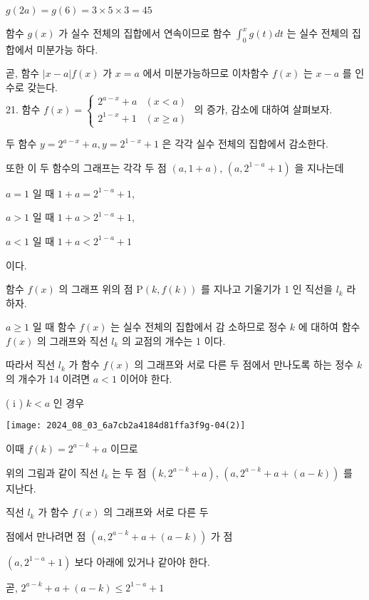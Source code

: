 \documentclass[10pt]{article}
\begin{document}
\(g(2 a)=g(6)=3 \times 5 \times 3=45\)

함수 \(g(x)\) 가 실수 전체의 집합에서 연속이므로 함수 \(\int_{0}^{x} g(t) d t\) 는 실수 전체의 집합에서 미분가능 하다.

곧, 함수 \(|x-a| f(x)\) 가 \(x=a\) 에서 미분가능하므로 이차함수 \(f(x)\) 는 \(x-a\) 를 인수로 갖는다.\\
21. 함수 \(f(x)=\left\{\begin{array}{ll}2^{a-x}+a & (x<a) \\ 2^{1-x}+1 & (x \geq a)\end{array}\right.\) 의 증가, 감소에 대하여 살펴보자.

두 함수 \(y=2^{a-x}+a, y=2^{1-x}+1\) 은 각각 실수 전체의 집합에서 감소한다.

또한 이 두 함수의 그래프는 각각 두 점 \((a, 1+a)\), \(\left(a, 2^{1-a}+1\right)\) 을 지나는데

\(a=1\) 일 때 \(1+a=2^{1-a}+1\),

\(a>1\) 일 때 \(1+a>2^{1-a}+1\),

\(a<1\) 일 때 \(1+a<2^{1-a}+1\)

이다.

함수 \(f(x)\) 의 그래프 위의 점 \(\mathrm{P}(k, f(k))\) 를 지나고 기울기가 1 인 직선을 \(l_{k}\) 라 하자.

\(a \geq 1\) 일 때 함수 \(f(x)\) 는 실수 전체의 집합에서 감 소하므로 정수 \(k\) 에 대하여 함수 \(f(x)\) 의 그래프와 직선 \(l_{k}\) 의 교점의 개수는 1 이다.

따라서 직선 \(l_{k}\) 가 함수 \(f(x)\) 의 그래프와 서로 다른 두 점에서 만나도록 하는 정수 \(k\) 의 개수가 14 이려면 \(a<1\) 이어야 한다.

( i ) \(k<a\) 인 경우

\begin{center}
\texttt{[image: 2024\_08\_03\_6a7cb2a4184d81ffa3f9g-04(2)]}
\end{center}

이때 \(f(k)=2^{a-k}+a\) 이므로

위의 그림과 같이 직선 \(l_{k}\) 는 두 점 \(\left(k, 2^{a-k}+a\right)\), \(\left(a, 2^{a-k}+a+(a-k)\right)\) 를 지난다.

직선 \(l_{k}\) 가 함수 \(f(x)\) 의 그래프와 서로 다른 두

점에서 만나려면 점 \(\left(a, 2^{a-k}+a+(a-k)\right)\) 가 점

\(\left(a, 2^{1-a}+1\right)\) 보다 아래에 있거나 같아야 한다.

곧, \(2^{a-k}+a+(a-k) \leq 2^{1-a}+1\)
\end{document}
